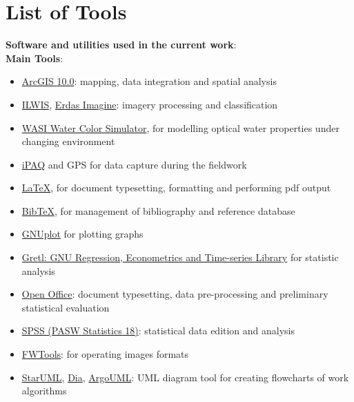 \documentclass[11pt]{article}
\begin{document}
\singlespace
\section*{List of Tools}\label{sec:0}

	\vspace{2em}

	\textbf{Software and utilities used in the current work}:\\
	
	\vspace{1ex}
	\textbf{Main Tools}:
	\begin{itemize}
		\item \href{http://www.esri.com/software/arcgis/index.html}{ArcGIS 10.0}: mapping, data integration and spatial analysis
		\item \href{http://www.ilwis.org/}{ILWIS}, \href{http://www.erdas.com/products/ERDASIMAGINE/ERDASIMAGINE/Details.aspx}{Erdas Imagine}: imagery processing and classification
		\item \href{http://www.filewatcher.com/b/ftp/ftp.dfd.dlr.de/pub/WASI.0.0.html}{WASI Water Color Simulator}, for modelling optical water 					properties under changing environment
		\item \href{http://welcome.hp.com/country/us/en/prodserv/handheld.html}{iPAQ} and \ac{GPS} for data capture during the fieldwork
		\item \href{http://www.latex-project.org/}{\LaTeX}, for document typesetting, formatting and performing pdf output
		\item \href{http://www.bibtex.org/de/}{BibTeX}, for management of bibliography and reference database
		\item \href{http://www.gnuplot.info/}{GNUplot} for plotting graphs
		\item \href{http://gretl.sourceforge.net/}{Gretl: GNU Regression, Econometrics and Time-series Library} for statistic analysis
		\item \href{http://www.openoffice.org/}{Open Office}: document typesetting, data pre-processing and preliminary statistical evaluation		
		\item \href{http://www.spss.com/}{SPSS (PASW Statistics 18)}: statistical data edition and analysis 
		\item \href{http://fwtools.maptools.org/}{FWTools}: for operating images formats	
		\item \href{http://staruml.sourceforge.net/en/}{StarUML}, \href{http://live.gnome.org/Dia}{Dia}, \href{http://argouml.tigris.org/}						{ArgoUML}: \ac{UML} diagram tool for creating flowcharts of work algorithms
	\end{itemize}
	
\end{document}
